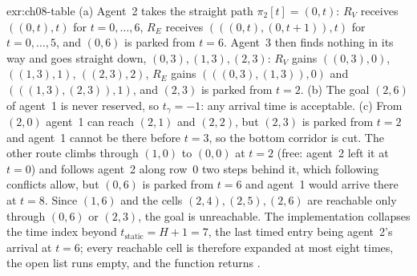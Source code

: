 
\begin{solution}{exr:ch08-table}
(a) Agent~2 takes the straight path $\pi_2[t] = (0,t)$: $R_V$ receives $((0,t), t)$ for $t = 0, \dots, 6$, $R_E$ receives $(((0,t),(0,t{+}1)), t)$ for $t = 0, \dots, 5$, and $(0,6)$ is parked from $t = 6$. Agent~3 then finds nothing in its way and goes straight down, $(0,3), (1,3), (2,3)$: $R_V$ gains $((0,3),0)$, $((1,3),1)$, $((2,3),2)$, $R_E$ gains $(((0,3),(1,3)),0)$ and $(((1,3),(2,3)),1)$, and $(2,3)$ is parked from $t = 2$. (b) The goal $(2,6)$ of agent~1 is never reserved, so $t_\gamma = -1$: any arrival time is acceptable. (c) From $(2,0)$ agent~1 can reach $(2,1)$ and $(2,2)$, but $(2,3)$ is parked from $t = 2$ and agent~1 cannot be there before $t = 3$, so the bottom corridor is cut. The other route climbs through $(1,0)$ to $(0,0)$ at $t = 2$ (free: agent~2 left it at $t = 0$) and follows agent~2 along row~$0$ two steps behind it, which following conflicts allow, but $(0,6)$ is parked from $t = 6$ and agent~1 would arrive there at $t = 8$. Since $(1,6)$ and the cells $(2,4), (2,5), (2,6)$ are reachable only through $(0,6)$ or $(2,3)$, the goal is unreachable. The implementation collapses the time index beyond $t_{\mathrm{static}} = H + 1 = 7$, the last timed entry being agent~2's arrival at $t = 6$; every reachable cell is therefore expanded at most eight times, the open list runs empty, and the function returns .
\end{solution}


